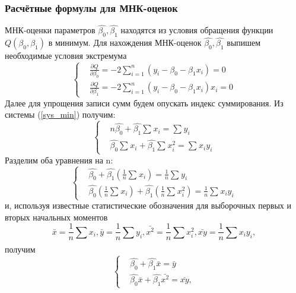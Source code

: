 \documentclass[a4paper,14pt]{article}
\begin{document}
	\subsubsection{Расчётные формулы для МНК-оценок}
	\noindent МНК-оценки параметров $\hat{\beta_0}, \hat{\beta_1}$ находятся из условия обращения функции $Q(\beta_0, \beta_1)$ в минимум. 
	\newline
	Для нахождения МНК-оценок $\hat{\beta_0}, \hat{\beta_1}$ выпишем необходимые условия экстремума
	\begin{equation}
		\begin{cases}
			& \frac{\partial Q}{\partial \beta_{0}}  = 
			-2\sum_{i=1}^{n}{(y_{i} - \beta_{0} - \beta_{1}x_{i})} = 0\\ 
			& \frac{\partial Q}{\partial \beta_{1}}  = 
			-2\sum_{i=1}^{n}{(y_{i} - \beta_{0} - \beta_{1}x_{i})x_{i}} = 0 
		\end{cases}
		\label{sys_min}
	\end{equation}
	Далее для упрощения записи сумм будем опускать индекс суммирования. Из системы (\ref{sys_min}) получим:
	\begin{equation}
		\begin{cases}
			& n\hat{\beta_{0}} + \hat{\beta_{1}}\sum_{}{}{x_{i}} = 
			\sum_{}{}{y_{i}}\\ 
			& \hat{\beta_{0}}\sum_{}{}{x_{i}} + \hat{\beta_{1}}\sum_{}{}{x_{i}^{2}} = \sum_{}{}{x_{i}y_{i}}
		\end{cases}
		\label{sys_2}
	\end{equation}
	Разделим оба уравнения на n:
	\begin{equation}
		\begin{cases}
			& \hat{\beta_{0}} + \hat{\beta_{1}}(\frac{1}{n}\sum_{}{}{x_{i}}) = 
			\frac{1}{n}\sum_{}{}{y_{i}}\\ 
			& \hat{\beta_{0}}(\frac{1}{n}\sum_{}{}{x_{i}}) + \hat{\beta_{1}}(\frac{1}{n}\sum_{}{}{x_{i}^{2}}) = \frac{1}{n}\sum_{}{}{x_{i}y_{i}}
		\end{cases}
		\label{sys_3}
	\end{equation}
	и, используя известные статистические обозначения для выборочных первых и вторых начальных моментов
	\begin{equation}
		\bar{x} = \frac{1}{n}\sum_{}{}{x_{i}}, \bar{y} = \frac{1}{n}\sum_{}{}{y_{i}}, \bar{x^{2}} = \frac{1}{n}\sum_{}{}{x_{i}^{2}}, \bar{xy} = \frac{1}{n}\sum_{}{}{x_{i}y_{i}}, 
	\end{equation}
	получим
	\begin{equation}
		\begin{cases}
			& \hat{\beta_{0}} + \hat{\beta_{1}}\bar{x} = 
			\bar{y}\\ 
			& \hat{\beta_{0}}\bar{x} + \hat{\beta_{1}}\bar{x^{2}} = \bar{xy},
		\end{cases}
		\label{sys_fin}
	\end{equation}
\end{document}
